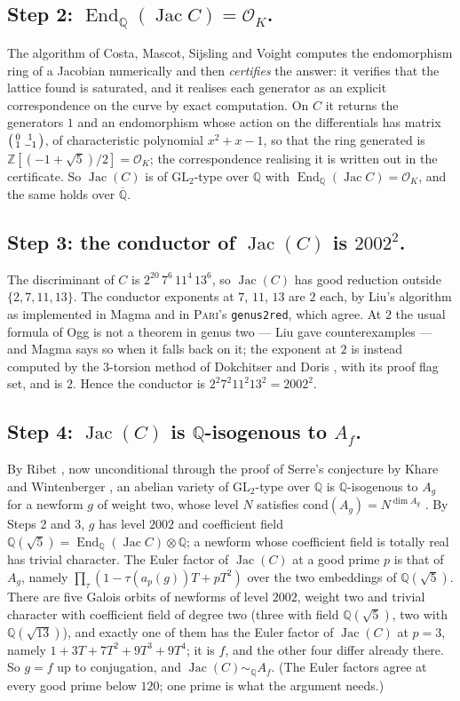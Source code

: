 \documentclass[11pt,reqno]{amsart}
\theoremstyle{plain}
\theoremstyle{definition}
\DeclareMathOperator{\Jac}{Jac}
\DeclareMathOperator{\End}{End}
\newcommand{\Q}{\mathbb{Q}}
\newcommand{\Z}{\mathbb{Z}}
\newcommand{\Qbar}{\overline{\mathbb{Q}}}
\newcommand{\OK}{\mathcal{O}_K}
\begin{document}
\subsection*{Step 2: $\End_\Q(\Jac C)=\OK$.}
The algorithm of Costa, Mascot, Sijsling and Voight \cite{cmsv} computes the endomorphism ring of a
Jacobian numerically and then \emph{certifies} the answer: it verifies that the lattice found is
saturated, and it realises each generator as an explicit correspondence on the curve by exact
computation. On $C$ it returns the generators $1$ and an endomorphism whose action on the
differentials has matrix $\begin{psmallmatrix}0&1\\1&-1\end{psmallmatrix}$, of characteristic
polynomial $x^2+x-1$, so that the ring generated is $\Z[(-1+\sqrt5)/2]=\OK$; the correspondence
realising it is written out in the certificate. So $\Jac(C)$ is of $\mathrm{GL}_2$-type over $\Q$
with $\End_\Q(\Jac C)=\OK$, and the same holds over $\Qbar$.

\subsection*{Step 3: the conductor of $\Jac(C)$ is $2002^2$.}
The discriminant of $C$ is $2^{20}\,7^6\,11^4\,13^6$, so $\Jac(C)$ has good reduction outside
$\{2,7,11,13\}$. The conductor exponents at $7$, $11$, $13$ are $2$ each, by Liu's algorithm as
implemented in Magma and in \textsc{Pari}'s \texttt{genus2red}, which agree. At $2$ the usual
formula of Ogg is not a theorem in genus two --- Liu gave counterexamples --- and Magma says so when
it falls back on it; the exponent at $2$ is instead computed by the $3$-torsion method of Dokchitser
and Doris \cite{dd}, with its proof flag set, and is $2$. Hence the conductor is
$2^2 7^2 11^2 13^2 = 2002^2$.

\subsection*{Step 4: $\Jac(C)$ is $\Q$-isogenous to $A_f$.}
By Ribet \cite[Theorem~4.4]{ribet92}, now unconditional through the proof of Serre's conjecture by
Khare and Wintenberger \cite{kw}, an abelian variety of $\mathrm{GL}_2$-type over $\Q$ is
$\Q$-isogenous to $A_g$ for a newform $g$ of weight two, whose level $N$ satisfies
$\mathrm{cond}(A_g)=N^{\dim A_g}$ \cite{carayol}. By Steps 2 and 3, $g$ has level $2002$ and
coefficient field $\Q(\sqrt5)=\End_\Q(\Jac C)\otimes\Q$; a newform whose coefficient field is
totally real has trivial character. The Euler factor of $\Jac(C)$ at a good prime $p$ is that of
$A_g$, namely $\prod_{\tau}(1-\tau(a_p(g))T+pT^2)$ over the two embeddings of $\Q(\sqrt5)$. There
are five Galois orbits of newforms of level $2002$, weight two and trivial character with
coefficient field of degree two (three with field $\Q(\sqrt5)$, two with $\Q(\sqrt{13})$), and
exactly one of them has the Euler factor of $\Jac(C)$ at $p=3$, namely
$1+3T+7T^2+9T^3+9T^4$; it is $f$, and the other four differ already there. So $g=f$ up to
conjugation, and $\Jac(C)\sim_\Q A_f$. (The Euler factors agree at every good prime below $120$;
one prime is what the argument needs.)
\end{document}

